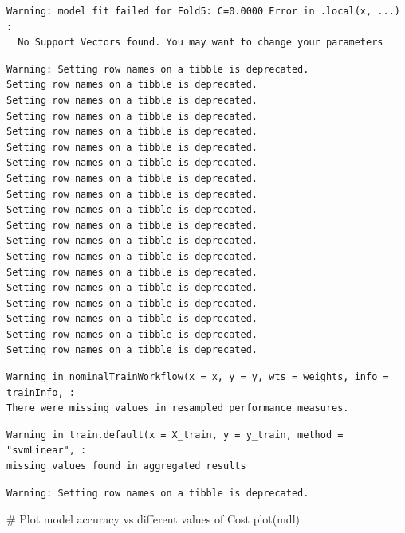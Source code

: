 \documentclass[
  letterpaper,
  DIV=11,
  numbers=noendperiod]{scrartcl}
\newenvironment{Shaded}{\begin{snugshade}}{\end{snugshade}}
\newcommand{\CommentTok}[1]{\textcolor[rgb]{0.37,0.37,0.37}{#1}}
\newcommand{\FunctionTok}[1]{\textcolor[rgb]{0.28,0.35,0.67}{#1}}
\newcommand{\NormalTok}[1]{\textcolor[rgb]{0.00,0.23,0.31}{#1}}
\begin{document}
\begin{verbatim}
Warning: model fit failed for Fold5: C=0.0000 Error in .local(x, ...) : 
  No Support Vectors found. You may want to change your parameters
\end{verbatim}

\begin{verbatim}
Warning: Setting row names on a tibble is deprecated.
Setting row names on a tibble is deprecated.
Setting row names on a tibble is deprecated.
Setting row names on a tibble is deprecated.
Setting row names on a tibble is deprecated.
Setting row names on a tibble is deprecated.
Setting row names on a tibble is deprecated.
Setting row names on a tibble is deprecated.
Setting row names on a tibble is deprecated.
Setting row names on a tibble is deprecated.
Setting row names on a tibble is deprecated.
Setting row names on a tibble is deprecated.
Setting row names on a tibble is deprecated.
Setting row names on a tibble is deprecated.
Setting row names on a tibble is deprecated.
Setting row names on a tibble is deprecated.
Setting row names on a tibble is deprecated.
Setting row names on a tibble is deprecated.
Setting row names on a tibble is deprecated.
\end{verbatim}

\begin{verbatim}
Warning in nominalTrainWorkflow(x = x, y = y, wts = weights, info = trainInfo, :
There were missing values in resampled performance measures.
\end{verbatim}

\begin{verbatim}
Warning in train.default(x = X_train, y = y_train, method = "svmLinear", :
missing values found in aggregated results
\end{verbatim}

\begin{verbatim}
Warning: Setting row names on a tibble is deprecated.
\end{verbatim}

\begin{Shaded}
\begin{Highlighting}[]
\CommentTok{\# Plot model accuracy vs different values of Cost}
\FunctionTok{plot}\NormalTok{(mdl)}
\end{Highlighting}
\end{Shaded}
\end{document}
